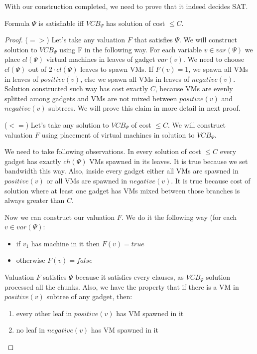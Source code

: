 With our construction completed, we need to prove that it indeed
decides SAT.

\begin{theorem}Formula $\Psi$ is satisfiable iff $VCB_{\Psi}$ has
solution of cost $\leq C$.
\end{theorem}

\begin{proof}
($=>$) Let's take any valuation $F$ that satisfies $\Psi$. We will construct
solution to $VCB_{\Psi}$ using F in the following way. For each
variable $v \in var(\Psi)$ we place $cl(\Psi)$ virtual machines in
leaves of gadget $var(v)$. We need to choose $cl(\Psi)$ out of
$2 \cdot cl(\Psi)$ leaves to spawn VMs. If $F(v) = 1$, we spawn all VMs in leaves
of $positive(v)$, else we spawn all VMs in leaves of
$negative(v)$. Solution constructed such way has cost exactly
$C$, because VMs are evenly splitted among gadgets and VMs are not
mixed between $positive(v)$ and $negative(v)$ subtrees. We will prove
this claim in more detail in next proof. 

($<=$) Let's take any solution to $VCB_{\Psi}$ of cost $\leq C$. We
will construct valuation $F$ using placement of virtual machines in
solution to $VCB_{\Psi}$.

We need to take following observations. In every solution of cost
$\leq C$ every gadget has exactly $ch(\Psi)$ VMs spawned in its
leaves. It is true because we set bandwidth this way. Also, inside every gadget either all VMs are spawned in
$positive(v)$ or all VMs are spawned in $negative(v)$. It is true
because cost of solution where at least one gadget has VMs mixed
between those branches is always greater than $C$.

Now we can construct our valuation $F$. We do it the following way
(for each $v \in var(\Psi)$:

\begin{itemize}
\item if $v_1$ has machine in it then $F(v) = true$
\item otherwise $F(v) = false$
\end{itemize}

Valuation $F$ satisfies $\Psi$ because it satisfies every clauses, as
$VCB_{\Psi}$ solution processed all the chunks. Also, we have the
property that if there is a VM in $positive(v)$ subtree of any gadget,
then:
\begin{enumerate}
\item every other leaf in $positive(v)$ has VM spawned in it
\item no leaf in $negative(v)$ has VM spawned in it
\end{enumerate}

\end{proof}

